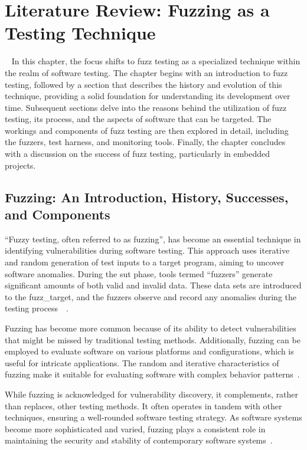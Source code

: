 \vspace{21.5pt}
\chapter{Literature Review: Fuzzing as a Testing Technique}~\label{sec:sec_fuzzing}
In this chapter, the focus shifts to fuzz testing as a specialized technique within the realm of
software testing. The chapter begins with an introduction to fuzz testing, followed by a section that
describes the history and evolution of this technique, providing a solid foundation for understanding
its development over time. Subsequent sections delve into the reasons behind the utilization of fuzz
testing, its process, and the aspects of software that can be targeted. The workings and components of
fuzz testing are then explored in detail, including the \gls{fuzzers}, test harness, and monitoring tools.
Finally, the chapter concludes with a discussion on the success of fuzz testing, particularly in embedded projects.

\section{Fuzzing: An Introduction, History, Successes, and Components}
``Fuzzy testing, often referred to as fuzzing'', has become an essential technique in
identifying vulnerabilities during software testing. This approach uses iterative and
random generation of test inputs to a target program, aiming to uncover software anomalies.
During the \gls{sut} phase, tools termed ``fuzzers'' generate significant amounts
of both valid and invalid data. These data sets are introduced to the \gls{fuzz_target}, and the
\gls{fuzzers} observe and record any anomalies during the testing process~\cite{klees2018evaluating}~\cite{li2018fuzzing}.

Fuzzing has become more common because of its ability to detect vulnerabilities\cite{thiel2008exposing}
that might be missed by traditional testing methods. Additionally, fuzzing can be employed
to evaluate software on various platforms and configurations, which is useful
for intricate applications. The random and iterative characteristics of fuzzing make it suitable for
evaluating software with complex behavior patterns~\cite{klees2018evaluating}.

While fuzzing is acknowledged for vulnerability discovery,
it complements, rather than replaces, other testing methods. It often operates in tandem with other techniques, ensuring
a well-rounded software testing strategy. As software
systems become more sophisticated and varied, fuzzing plays a consistent role in maintaining the security
and stability of contemporary software systems~\cite{kim2011efficient}.

